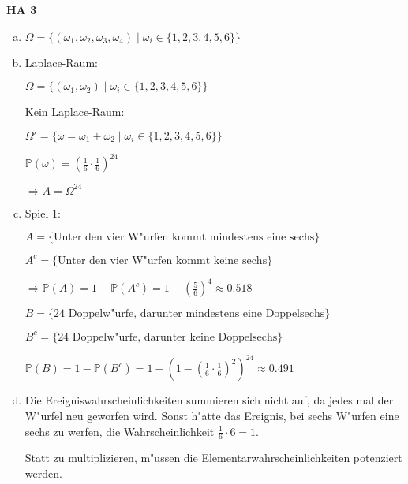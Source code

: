 \documentclass[a4paper,12pt]{article}
\newcommand{\Aufgabe}[1]{
        {
        \vspace*{0.5cm}
        \textbf{HA #1}
        \vspace*{0.2cm}
    }
}
\begin{document}
    \Aufgabe{3}
    \begin{enumerate}[(a)]
        \item 
        $ \Omega = \{(\omega_1, \omega_2, \omega_3, \omega_4) \mid \omega_i \in \{1, 2, 3, 4, 5, 6\}\} $

        \item 
        Laplace-Raum:

        $ \Omega = \{(\omega_1, \omega_2) \mid \omega_i \in \{1, 2, 3, 4, 5, 6\}\} $

        Kein Laplace-Raum:

        $ \Omega' = \{\omega = \omega_1 + \omega_2 \mid \omega_i \in \{1, 2, 3, 4, 5, 6\}\} $

        $ \displaystyle \mathbb{P}(\omega) = (\frac{1}{6} \cdot \frac{1}{6})^24  $

        $ \Rightarrow A = \Omega^{24} $

        \item
        Spiel 1:

        $ A = \{\text{Unter den vier W"urfen kommt mindestens eine sechs}\} $

        $ A^c = \{\text{Unter den vier W"urfen kommt keine sechs}\} $

        $ \displaystyle \Rightarrow \mathbb{P}(A) = 1 - \mathbb{P}(A^c) = 1 - (\frac{5}{6})^4 \approx 0.518 $

        $ B = \{\text{24 Doppelw"urfe, darunter mindestens eine Doppelsechs}\} $

        $ B^c = \{\text{24 Doppelw"urfe, darunter keine Doppelsechs}\} $

        $ \displaystyle \mathbb{P}(B) = 1 - \mathbb{P}(B^c) = 1 - (1 - (\frac{1}{6} \cdot \frac{1}{6})^2)^{24} \approx 0.491 $

        \item
        Die Ereigniswahrscheinlichkeiten summieren sich nicht auf, da jedes mal der W"urfel neu geworfen wird.
        Sonst h"atte das Ereignis, bei sechs W"urfen eine sechs zu werfen, die Wahrscheinlichkeit $ \frac{1}{6} \cdot 6  = 1 $.

        Statt zu multiplizieren, m"ussen die Elementarwahrscheinlichkeiten potenziert werden.
    \end{enumerate}
\end{document}
